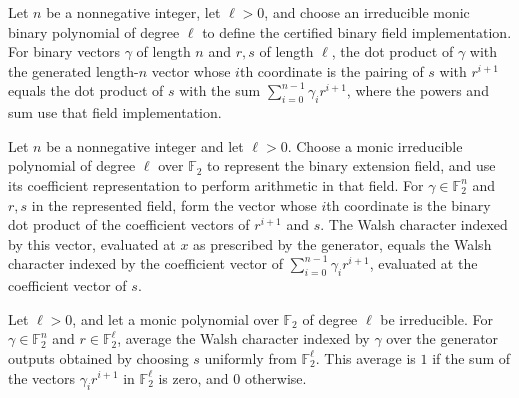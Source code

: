 \begin{theorem}
\leanok
{}
Let $n$ be a nonnegative integer, let $\ell>0$, and choose an irreducible monic binary
polynomial of degree $\ell$ to define the certified binary field implementation. For
binary vectors $\gamma$ of length $n$ and $r,s$ of length $\ell$, the dot product of
$\gamma$ with the generated length-$n$ vector whose $i$th coordinate is the pairing of
$s$ with $r^{i+1}$ equals the dot product of $s$ with the sum $\sum_{i=0}^{n-1}\gamma_i
r^{i+1}$, where the powers and sum use that field implementation.
\end{theorem}

\begin{theorem}
\label{FABL.vectorWalshCharacter_executableSmallBiasGenerator}
\leanok
{}
Let $n$ be a nonnegative integer and let $\ell>0$. Choose a monic irreducible polynomial
of degree $\ell$ over $\mathbb F_2$ to represent the binary extension field, and use its
coefficient representation to perform arithmetic in that field. For $\gamma\in\mathbb
F_2^n$ and $r,s$ in the represented field, form the vector whose $i$th coordinate is the
binary dot product of the coefficient vectors of $r^{i+1}$ and $s$. The Walsh character
indexed by this vector, evaluated at $x$ as prescribed by the generator, equals the
Walsh character indexed by the coefficient vector of $\sum_{i=0}^{n-1}\gamma_i r^{i+1}$,
evaluated at the coefficient vector of $s$.
\end{theorem}

\begin{theorem}
\label{FABL.expect_executableSmallBiasGenerator_fixed_first}
\leanok
{}
Let $\ell>0$, and let a monic polynomial over $\mathbb F_2$ of degree $\ell$ be
irreducible. For $\gamma\in\mathbb F_2^n$ and $r\in\mathbb F_2^\ell$, average the Walsh
character indexed by $\gamma$ over the generator outputs obtained by choosing $s$
uniformly from $\mathbb F_2^\ell$. This average is $1$ if the sum of the vectors
$\gamma_i r^{i+1}$ in $\mathbb F_2^\ell$ is zero, and $0$ otherwise.
\end{theorem}

